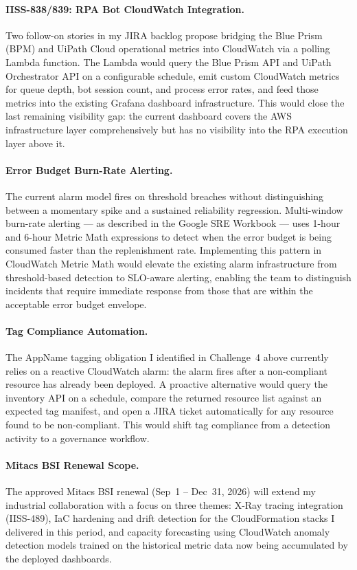\paragraph{IISS-838/839: RPA Bot CloudWatch Integration.}
Two follow-on stories in my JIRA backlog propose bridging the Blue Prism
(BPM) and UiPath Cloud operational metrics into CloudWatch via a polling
Lambda function. The Lambda would query the Blue Prism API and UiPath
Orchestrator API on a configurable schedule, emit custom CloudWatch metrics
for queue depth, bot session count, and process error rates, and feed those
metrics into the existing Grafana dashboard infrastructure. This would close
the last remaining visibility gap: the current dashboard covers the AWS
infrastructure layer comprehensively but has no visibility into the RPA
execution layer above it.

\paragraph{Error Budget Burn-Rate Alerting.}
The current alarm model fires on threshold breaches without distinguishing
between a momentary spike and a sustained reliability regression. Multi-window
burn-rate alerting --- as described in the Google SRE Workbook --- uses
1-hour and 6-hour Metric Math expressions to detect when the error budget is
being consumed faster than the replenishment rate. Implementing this pattern
in CloudWatch Metric Math would elevate the existing alarm infrastructure from
threshold-based detection to SLO-aware alerting, enabling the team to
distinguish incidents that require immediate response from those that are
within the acceptable error budget envelope.

\paragraph{Tag Compliance Automation.}
The AppName tagging obligation I identified in Challenge~4 above currently
relies on a reactive CloudWatch alarm: the alarm fires after a non-compliant
resource has already been deployed. A proactive alternative would query the
inventory API on a schedule, compare the returned resource list against an
expected tag manifest, and open a JIRA ticket automatically for any resource
found to be non-compliant. This would shift tag compliance from a detection
activity to a governance workflow.

\paragraph{Mitacs BSI Renewal Scope.}
The approved Mitacs BSI renewal (Sep~1 -- Dec~31, 2026) will extend
my industrial collaboration with a focus on three themes: X-Ray tracing
integration (IISS-489), IaC hardening and drift detection for the CloudFormation
stacks I delivered in this period, and capacity forecasting using CloudWatch
anomaly detection models trained on the historical metric data now being
accumulated by the deployed dashboards.
